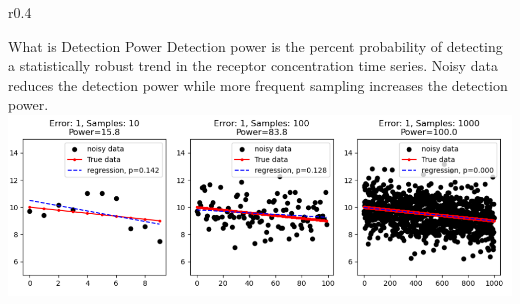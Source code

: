 \begin{wrapfig}{r}{0.4\textwidth}
    \begin{breakawaybox}[label={box:dp}]{What is Detection Power}
        Detection power is the percent probability of detecting a statistically robust trend in the receptor concentration time series. Noisy data reduces the detection power while more frequent sampling increases the detection power. 
        \includegraphics{figures/dp_ex}
    \end{breakawaybox}
\end{wrapfig}

